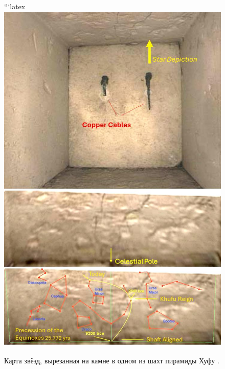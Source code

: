 \documentclass[10pt,twocolumn,letterpaper]{article}
\begin{document}
\begin{figure}[H]
\begin{center}
```latex
   \includegraphics[width=1\linewidth]{star-stone.jpg}
\end{center}
   \caption{Карта звёзд, вырезанная на камне в одном из шахт пирамиды Хуфу \cite{28}.}
\label{fig:20}
\label{fig:onecol}
\end{figure}
\end{document}
